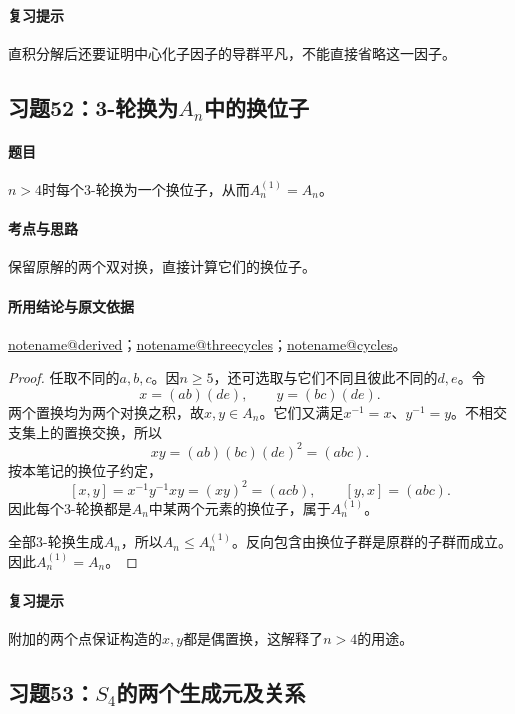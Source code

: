 \documentclass[UTF8,a4paper,11pt,fontset=windows]{ctexart}
\makeatletter
\newcommand{\noteref}[1]{\hyperref[note:#1]{\csname notename@#1\endcsname}}
\newcommand{\exref}[2]{\hyperref[ex:#1:#2]{第#1章习题#2}}
\makeatother
\begin{document}
\paragraph{复习提示}
直积分解后还要证明中心化子因子的导群平凡，不能直接省略这一因子。


\subsection{习题52：\texorpdfstring{3-轮换为$A_n$中的换位子}{3-轮换为An中的换位子}}
\label{ex:2:52}

\paragraph{题目}
$n>4$时每个3-轮换为一个换位子，从而$A_n^{(1)}=A_n$。

\paragraph{考点与思路}
保留原解的两个双对换，直接计算它们的换位子。

\paragraph{所用结论与原文依据}
\noteref{derived}；\noteref{threecycles}；\noteref{cycles}。


\begin{proof}
任取不同的$a,b,c$。因$n\geq5$，还可选取与它们不同且彼此不同的$d,e$。令
\[
x=(ab)(de),\qquad y=(bc)(de).
\]
两个置换均为两个对换之积，故$x,y\in A_n$。它们又满足$x^{-1}=x$、$y^{-1}=y$。不相交支集上的置换交换，所以
\[
xy=(ab)(bc)(de)^2=(abc).
\]
按本笔记的换位子约定，
\[
[x,y]=x^{-1}y^{-1}xy=(xy)^2=(acb),\qquad
[y,x]=(abc).
\]
因此每个3-轮换都是$A_n$中某两个元素的换位子，属于$A_n^{(1)}$。

全部3-轮换生成$A_n$，所以$A_n\leq A_n^{(1)}$。反向包含由换位子群是原群的子群而成立。因此$A_n^{(1)}=A_n$。
\end{proof}

\paragraph{复习提示}
附加的两个点保证构造的$x,y$都是偶置换，这解释了$n>4$的用途。


\subsection{习题53：\texorpdfstring{$S_4$的两个生成元及关系}{S4的两个生成元及关系}}
\label{ex:2:53}
\end{document}
